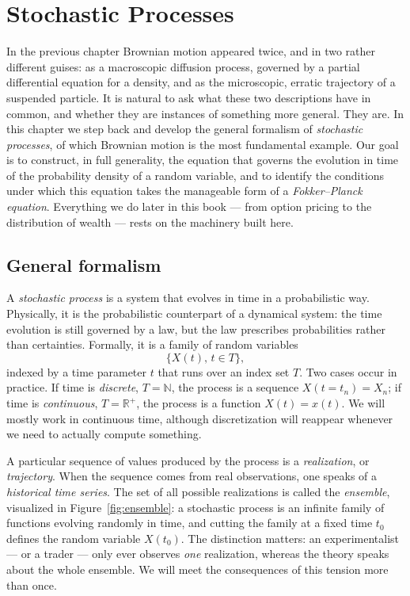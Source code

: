 
\chapter{Stochastic Processes}

In the previous chapter Brownian motion appeared twice, and in two rather different guises: as a macroscopic diffusion process, governed by a partial differential equation for a density, and as the microscopic, erratic trajectory of a suspended particle.
It is natural to ask what these two descriptions have in common, and whether they are instances of something more general.
They are.
In this chapter we step back and develop the general formalism of \emph{stochastic processes}, of which Brownian motion is the most fundamental example.
Our goal is to construct, in full generality, the equation that governs the evolution in time of the probability density of a random variable, and to identify the conditions under which this equation takes the manageable form of a \emph{Fokker--Planck equation}.
Everything we do later in this book --- from option pricing to the distribution of wealth --- rests on the machinery built here.


\section{General formalism}

A \emph{stochastic process} is a system that evolves in time in a probabilistic way.
Physically, it is the probabilistic counterpart of a dynamical system: the time evolution is still governed by a law, but the law prescribes probabilities rather than certainties.
Formally, it is a family of random variables
\begin{equation}
\{X(t),\, t\in T\},
\end{equation}
indexed by a time parameter $t$ that runs over an index set $T$.
Two cases occur in practice.
If time is \emph{discrete}, $T=\mathbb{N}$, the process is a sequence $X(t=t_n)=X_n$; if time is \emph{continuous}, $T=\mathbb{R}^+$, the process is a function $X(t)=x(t)$.
We will mostly work in continuous time, although discretization will reappear whenever we need to actually compute something.

A particular sequence of values produced by the process is a \emph{realization}, or \emph{trajectory}.
When the sequence comes from real observations, one speaks of a \emph{historical time series}.
The set of all possible realizations is called the \emph{ensemble}, visualized in Figure~\ref{fig:ensemble}: a stochastic process is an infinite family of functions evolving randomly in time, and cutting the family at a fixed time $t_0$ defines the random variable $X(t_0)$.
The distinction matters: an experimentalist --- or a trader --- only ever observes \emph{one} realization, whereas the theory speaks about the whole ensemble.
We will meet the consequences of this tension more than once.

